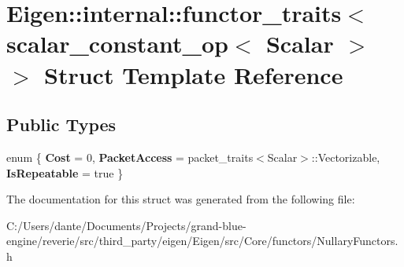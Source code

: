 \hypertarget{struct_eigen_1_1internal_1_1functor__traits_3_01scalar__constant__op_3_01_scalar_01_4_01_4}{}\section{Eigen\+::internal\+::functor\+\_\+traits$<$ scalar\+\_\+constant\+\_\+op$<$ Scalar $>$ $>$ Struct Template Reference}
\label{struct_eigen_1_1internal_1_1functor__traits_3_01scalar__constant__op_3_01_scalar_01_4_01_4}
\subsection*{Public Types}
\begin{DoxyCompactItemize}
\item 
\mbox{\label{struct_eigen_1_1internal_1_1functor__traits_3_01scalar__constant__op_3_01_scalar_01_4_01_4_ad852b6c6a4731962320d6085b3b156ab}} 
enum \{ {\bfseries Cost} = 0, 
{\bfseries Packet\+Access} = packet\+\_\+traits$<$Scalar$>$\+::Vectorizable, 
{\bfseries Is\+Repeatable} = true
 \}
\end{DoxyCompactItemize}


The documentation for this struct was generated from the following file\+:\begin{DoxyCompactItemize}
\item 
C\+:/\+Users/dante/\+Documents/\+Projects/grand-\/blue-\/engine/reverie/src/third\+\_\+party/eigen/\+Eigen/src/\+Core/functors/Nullary\+Functors.\+h\end{DoxyCompactItemize}
